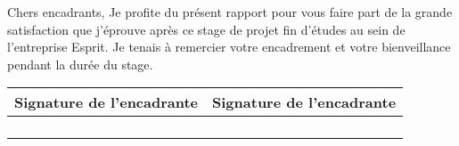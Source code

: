 \thispagestyle{empty}
\thispagestyle{empty}
\begin{center}
\ungaramond{\textbf{\LARGE\color{blue}{Signature}}}
\end{center}
\vspace{0.8cm}
Chers encadrants,\newline
Je profite du présent rapport pour vous faire part de la grande satisfaction que j'éprouve après ce stage de projet fin d'études au sein de l'entreprise Esprit.
Je tenais à remercier votre encadrement et votre bienveillance pendant la durée du stage.
\newline
\newline
\newline
\newline
\newline
\newline
\newline
 \begin{tabular}{|l|l|}
  \hline
 Signature de l'encadrante  & Signature de l'encadrante  \\
  \hline
     & \\
   &  \\
    &  \\
     &  \\
  \hline
\end{tabular}